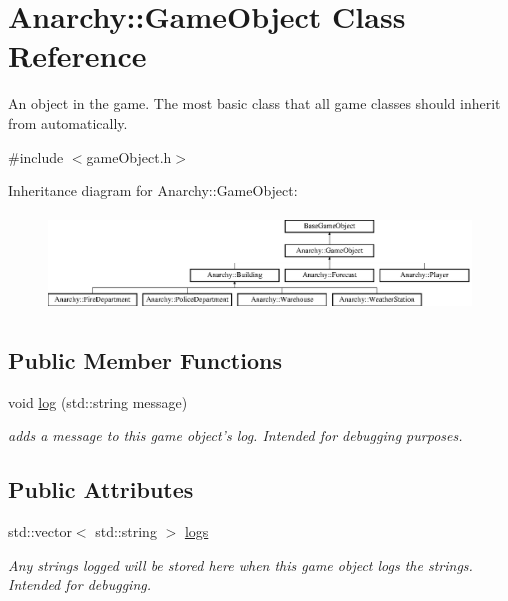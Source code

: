 \hypertarget{classAnarchy_1_1GameObject}{\section{Anarchy\-:\-:Game\-Object Class Reference}
\label{classAnarchy_1_1GameObject}
}


An object in the game. The most basic class that all game classes should inherit from automatically.  




{\ttfamily \#include $<$game\-Object.\-h$>$}

Inheritance diagram for Anarchy\-:\-:Game\-Object\-:\begin{figure}[H]
\begin{center}
\leavevmode
\includegraphics[height=2.574713cm]{classAnarchy_1_1GameObject}
\end{center}
\end{figure}
\subsection*{Public Member Functions}
\begin{DoxyCompactItemize}
\item 
void \hyperlink{classAnarchy_1_1GameObject_a962246ccd2b9ecf15478a9b46e6340fb}{log} (std\-::string message)
\begin{DoxyCompactList}\small\item\em adds a message to this game object's log. Intended for debugging purposes. \end{DoxyCompactList}\end{DoxyCompactItemize}
\subsection*{Public Attributes}
\begin{DoxyCompactItemize}
\item 
std\-::vector$<$ std\-::string $>$ \hyperlink{classAnarchy_1_1GameObject_ac1d185992a4219a51e1d1d5f71114567}{logs}
\begin{DoxyCompactList}\small\item\em Any strings logged will be stored here when this game object logs the strings. Intended for debugging. \end{DoxyCompactList}\end{DoxyCompactItemize}
